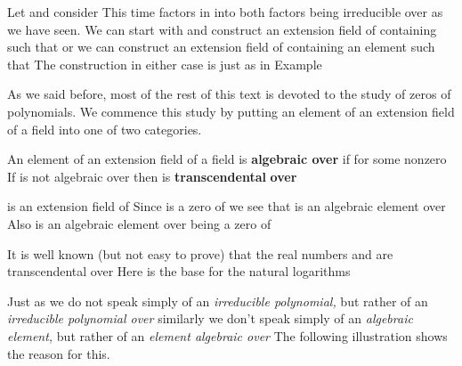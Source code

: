 \documentclass[11pt,oneside]{article}
\begin{document}
\begin{BookBody}
 Let  and consider  This time  factors in  into  both factors being irreducible over  as we have seen. We can start with  and construct an extension field  of  containing \BookInline{\alpha } such that  or we can construct an extension field  of  containing an element \BookInline{\beta } such that  The construction in either case is just as in Example \BookEnd{\blacktriangle}


\noindent As we said before, most of the rest of this text is devoted to the study of zeros of polynomials. We commence this study by putting an element of an extension field  of a field  into one of two categories.

 An element \BookInline{\alpha } of an extension field  of a field  is\textbf{ algebraic over}  if  for some nonzero  If \BookInline{\alpha } is not algebraic over  then \BookInline{\alpha } is\textbf{ transcendental} \textbf{over} \BookEnd{\blacksquare}

  is an extension field of  Since  is a zero of  we see that  is an algebraic element over  Also is an algebraic element over  being a zero of \BookEnd{\blacktriangle}

 It is well known (but not easy to prove) that the real numbers \BookInline{\pi } and  are transcendental over  Here  is the base for the natural logarithms\BookEnd{\blacktriangle}

Just as we do not speak simply of an\textit{ irreducible polynomial,} but rather of an\textit{ ir}\textit{reducible polynomial over}  similarly we don’t speak simply of an\textit{ algebraic element,} but rather of an\textit{ element algebraic over}  The following illustration shows the reason for this.


\end{BookBody}
\end{document}
